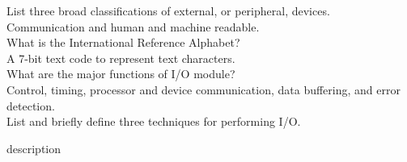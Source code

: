 \documentclass[12pt,largemargins]{homework}
\date{Septemeber 6, 2018}
\begin{document}
\maketitle
{}
List three broad classifications of external, or peripheral, devices.\\
Communication and human and machine readable.\\
What is the International Reference Alphabet?\\
A 7-bit text code to represent text characters.\\
What are the major functions of I/O module?\\
Control, timing, processor and device communication, data buffering, and error detection.\\
List and briefly define three techniques for performing I/O.\\
\begin{alphaparts}
	\item description
\end{alphaparts}
\end{document}
